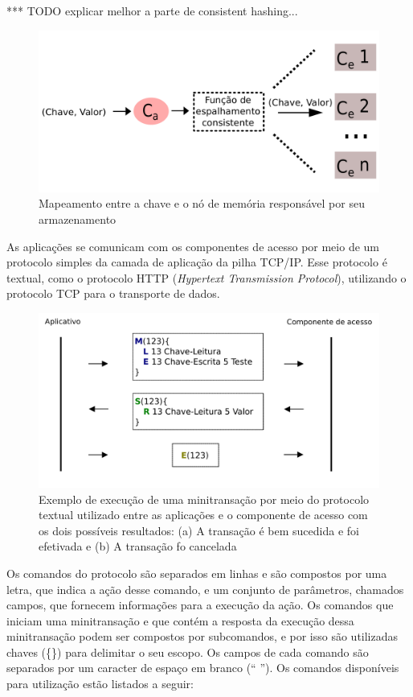 \documentclass[11pt,twoside,a4paper]{book}
\begin{document}
*** TODO explicar melhor a parte de consistent hashing...

\begin{figure}
  \centering
  \includegraphics[width=.80\textwidth]{funcao_espalhamento} 
  \caption{Mapeamento entre a chave e o nó de memória responsável por seu armazenamento}
  \label{fig:funcao_espalhamento} 
\end{figure}

As aplicações se comunicam com os componentes de acesso por meio de um protocolo simples da camada de aplicação da pilha TCP/IP. Esse protocolo é textual, como o protocolo HTTP (\emph{Hypertext Transmission Protocol}), utilizando o protocolo TCP para o transporte de dados. 

\begin{figure}
  \centering
  \includegraphics[width=.80\textwidth]{protocolo} 
  \caption{Exemplo de execução de uma minitransação por meio do protocolo textual utilizado entre as aplicações e o componente de acesso com os dois possíveis resultados: (a) A transação é bem sucedida e foi efetivada e (b) A transação fo cancelada}
  \label{fig:protocolo} 
\end{figure}

Os comandos do protocolo são separados em linhas e são compostos por uma letra, que indica a ação desse comando, e um conjunto de parâmetros, chamados campos, que fornecem informações para a execução da ação. Os comandos que iniciam uma minitransação e que contém a resposta da execução dessa minitransação podem ser compostos por subcomandos, e por isso são utilizadas chaves (\{\}) para delimitar o seu escopo. Os campos de cada comando são separados por um caracter de espaço em branco (`` ''). Os comandos disponíveis para utilização estão listados a seguir:
\end{document}
